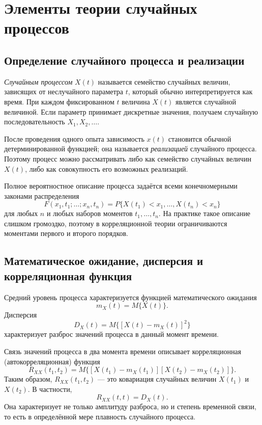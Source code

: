 \section{Элементы теории случайных процессов}
\label{sec:random-processes}

\subsection{Определение случайного процесса и реализации}

\emph{Случайным процессом} $X(t)$ называется семейство случайных величин,
зависящих от неслучайного параметра $t$, который обычно интерпретируется как
время. При каждом фиксированном $t$ величина $X(t)$ является случайной
величиной. Если параметр принимает дискретные значения, получаем случайную
последовательность $X_1,X_2,\ldots$.

После проведения одного опыта зависимость $x(t)$ становится обычной
детерминированной функцией; она называется \emph{реализацией} случайного
процесса. Поэтому процесс можно рассматривать либо как семейство случайных
величин $X(t)$, либо как совокупность его возможных реализаций.

Полное вероятностное описание процесса задаётся всеми конечномерными законами
распределения
\[
    F(x_1,t_1;\ldots;x_n,t_n)
    =P\{X(t_1)<x_1,\ldots,X(t_n)<x_n\}
\]
для любых $n$ и любых наборов моментов $t_1,\ldots,t_n$. На практике такое
описание слишком громоздко, поэтому в корреляционной теории ограничиваются
моментами первого и второго порядков.

\subsection{Математическое ожидание, дисперсия и корреляционная функция}

Средний уровень процесса характеризуется функцией математического ожидания
\[
    m_X(t)=M\{X(t)\}.
\]
Дисперсия
\[
    D_X(t)=M\{[X(t)-m_X(t)]^2\}
\]
характеризует разброс значений процесса в данный момент времени.

Связь значений процесса в два момента времени описывает корреляционная
(автокорреляционная) функция
\[
    R_{XX}(t_1,t_2)
    =M\{[X(t_1)-m_X(t_1)][X(t_2)-m_X(t_2)]\}.
\]
Таким образом, $R_{XX}(t_1,t_2)$ --- это ковариация случайных величин
$X(t_1)$ и $X(t_2)$. В частности,
\[
    R_{XX}(t,t)=D_X(t).
\]
Она характеризует не только амплитуду разброса, но и степень временной связи,
то есть в определённой мере плавность случайного процесса.

